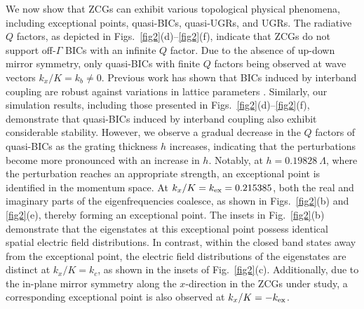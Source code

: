 \documentclass[%
 reprint,
superscriptaddress,
 amsmath,amssymb, aps,
]{revtex4-1}
\begin{document}
We now show that ZCGs can exhibit various topological physical phenomena, including exceptional points, quasi-BICs, quasi-UGRs, and UGRs. The radiative $Q$ factors, as depicted in Figs.~\ref{fig2}(d)--\ref{fig2}(f), indicate that ZCGs do not support off-$\Gamma$ BICs with an infinite $Q$ factor. Due to the absence of up-down mirror symmetry, only quasi-BICs with finite $Q$ factors being observed at wave vectors $k_x/K=k_b\neq 0$. Previous work has shown that BICs induced by interband coupling are robust against variations in lattice parameters \cite{SGLee2020-1}. Similarly, our simulation results, including those presented in Figs.~\ref{fig2}(d)--\ref{fig2}(f), demonstrate that quasi-BICs induced by interband coupling also exhibit considerable stability. However, we observe a gradual decrease in the $Q$ factors of quasi-BICs as the grating thickness $h$ increases, indicating that the perturbations become more pronounced with an increase in $h$. Notably, at $h=0.19828~\Lambda$, where the perturbation reaches an appropriate strength, an exceptional point is identified in the momentum space. At $k_x/K=k_{\rm{ex}}=0.215385$, both the real and imaginary parts of the eigenfrequencies coalesce, as shown in Figs.~\ref{fig2}(b) and \ref{fig2}(e), thereby forming an exceptional point. The insets in Fig.~\ref{fig2}(b) demonstrate that the eigenstates at this exceptional point possess identical spatial electric field distributions. In contrast, within the closed band states away from the exceptional point, the electric field distributions of the eigenstates are distinct at $k_x/K=k_c$, as shown in the insets of Fig.~\ref{fig2}(c). Additionally, due to the in-plane mirror symmetry along the $x$-direction in the ZCGs under study, a corresponding exceptional point is also observed at $k_x/K=-k_{\rm{ex}}$.
\end{document}
